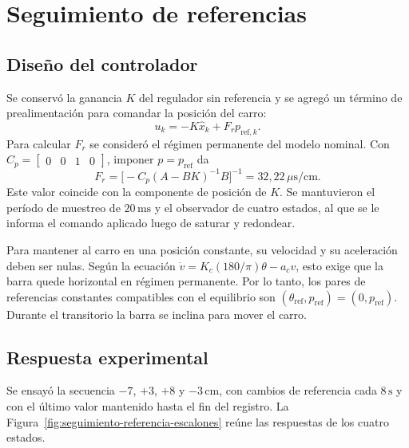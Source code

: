\documentclass[a4paper, twoside, 10pt, spanish]{article}
\numberwithin{table}{section}
\begin{document}
\section{Seguimiento de referencias}
\label{sec:seguimiento-referencias}

\subsection{Diseño del controlador}

Se conservó la ganancia $K$ del regulador sin referencia y se agregó un término de prealimentación para comandar la posición del carro:
\begin{equation}
    u_k = -K\hat{x}_k + F_r p_{\mathrm{ref},k}.
\end{equation}
Para calcular $F_r$ se consideró el régimen permanente del modelo nominal. Con $C_p = \begin{bmatrix}0 & 0 & 1 & 0\end{bmatrix}$, imponer $p = p_{\mathrm{ref}}$ da
\begin{equation}
    F_r = \bigl[-C_p(A-BK)^{-1}B\bigr]^{-1}
        = 32{,}22\,\mu\mathrm{s}/\mathrm{cm}.
\end{equation}
Este valor coincide con la componente de posición de $K$. Se mantuvieron el período de muestreo de $20\,\mathrm{ms}$ y el observador de cuatro estados, al que se le informa el comando aplicado luego de saturar y redondear.

Para mantener al carro en una posición constante, su velocidad y su aceleración deben ser nulas. Según la ecuación $\dot v = K_c(180/\pi)\theta - a_c v$, esto exige que la barra quede horizontal en régimen permanente. Por lo tanto, los pares de referencias constantes compatibles con el equilibrio son $(\theta_{\mathrm{ref}},p_{\mathrm{ref}})=(0,p_{\mathrm{ref}})$. Durante el transitorio la barra se inclina para mover el carro.

\subsection{Respuesta experimental}

Se ensayó la secuencia $-7$, $+3$, $+8$ y $-3\,\mathrm{cm}$, con cambios de referencia cada $8\,\mathrm{s}$ y con el último valor mantenido hasta el fin del registro. La Figura~\ref{fig:seguimiento-referencia-escalones} reúne las respuestas de los cuatro estados.
\end{document}
